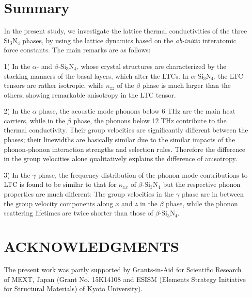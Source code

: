 \documentclass[twocolumn,amsmath,amssymb,a4paper,prb,superscriptaddress,floatfix]{revtex4-1}
\begin{document}

\section{Summary}

In the present study, we investigate the lattice thermal conductivities of the
three Si$_3$N$_4$ phases, by using the lattice dynamics based on the {\it
ab-initio} interatomic force constants. The main remarks are as follows:

1) In the $\alpha$- and $\beta$-Si$_3$N$_4$, whose crystal structures are
characterized by the stacking manners of the basal layers, which alter the
LTCs. In $\alpha$-Si$_3$N$_4$, the LTC tensors are rather isotropic, while
$\kappa$$_{zz}$ of the $\beta$ phase is much larger than the others, showing
remarkable anisotropy in the LTC tensor. 

2) In the $\alpha$ phase, the acoustic mode phonons below 6 THz are the main
heat carriers, while in the $\beta$ phase, the phonons below 12 THz contribute
to the thermal conductivity. Their group velocities are significantly different
between the phases; their linewidths are basically similar due to the similar
impacts of the phonon-phonon interaction strengths and selection rules.
Therefore the difference in the group velocities alone qualitatively explains
the difference of anisotropy.

3) In the $\gamma$ phase, the frequency distribution of the phonon mode
contributions to LTC is found to be similar to that for $\kappa$$_{xx}$ of
$\beta$-Si$_3$N$_4$ but the respective phonon properties are much different:
The group velocities in the $\gamma$ phase are in between the group velocity
components along $x$ and $z$ in the $\beta$ phase, while the phonon scattering
lifetimes are twice shorter than those of $\beta$-Si$_3$N$_4$.

\section*{ACKNOWLEDGMENTS}
The present work was partly supported by Grants-in-Aid for Scientific
Research of MEXT, Japan (Grant No. 15K14108 and ESISM (Elements Strategy
Initiative for Structural Materials) of Kyoto University).
\end{document}
